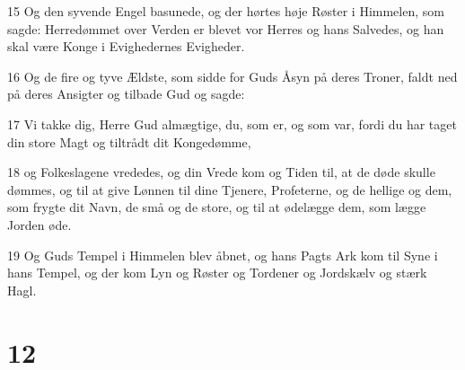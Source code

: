 \par 15 Og den syvende Engel basunede, og der hørtes høje Røster i Himmelen, som sagde: Herredømmet over Verden er blevet vor Herres og hans Salvedes, og han skal være Konge i Evighedernes Evigheder.
\par 16 Og de fire og tyve Ældste, som sidde for Guds Åsyn på deres Troner, faldt ned på deres Ansigter og tilbade Gud og sagde:
\par 17 Vi takke dig, Herre Gud almægtige, du, som er, og som var, fordi du har taget din store Magt og tiltrådt dit Kongedømme,
\par 18 og Folkeslagene vrededes, og din Vrede kom og Tiden til, at de døde skulle dømmes, og til at give Lønnen til dine Tjenere, Profeterne, og de hellige og dem, som frygte dit Navn, de små og de store, og til at ødelægge dem, som lægge Jorden øde.
\par 19 Og Guds Tempel i Himmelen blev åbnet, og hans Pagts Ark kom til Syne i hans Tempel, og der kom Lyn og Røster og Tordener og Jordskælv og stærk Hagl.

\chapter{12}

